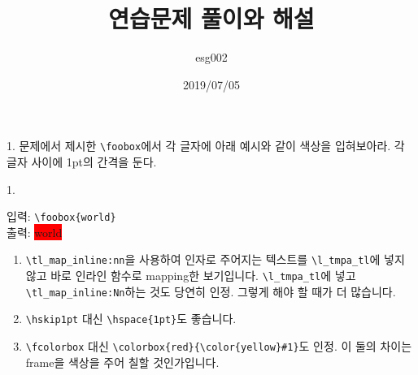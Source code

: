 \documentclass[a4paper,amsmath]{oblivoir}
\begin{document}

\title{연습문제 풀이와 해설}
\author{esg002}
\date{2019/07/05}

\maketitle

\begin{questionp}
 1. 문제에서 제시한 \verb|\foobox|에서 각 글자에 아래 예시와 같이 색상을 입혀보아라. 각 글자 사이에 1pt의 간격을 둔다.

\tcblower

1. \begin{minipage}[t]{\dimexpr\textwidth-3em\relax}
입력: \verb|\foobox{world}|\\
출력: \colorbox{red}{\color{yellow}w}\hskip1pt\colorbox{red}{\color{yellow}o}\hskip1pt\colorbox{red}{\color{yellow}r}\hskip1pt\colorbox{red}{\color{yellow}l}\hskip1pt\colorbox{red}{\color{yellow}d}
\end{minipage}
\end{questionp}


\begin{enumerate}[주 1.] \firmlist
\item \verb|\tl_map_inline:nn|을 사용하여 인자로 주어지는 텍스트를 \verb|\l_tmpa_tl|에 넣지 않고 바로 인라인 함수로 mapping한 보기입니다. \verb|\l_tmpa_tl|에 넣고 \verb|\tl_map_inline:Nn|하는 것도 당연히 인정. 그렇게 해야 할 때가 더 많습니다.
\item \verb|\hskip1pt| 대신 \verb|\hspace{1pt}|도 좋습니다.
\item \verb|\fcolorbox| 대신 \verb|\colorbox{red}{\color{yellow}#1}|도 인정. 이 둘의 차이는 frame을 색상을 주어 칠할 것인가입니다.
\end{enumerate}
\end{document}

